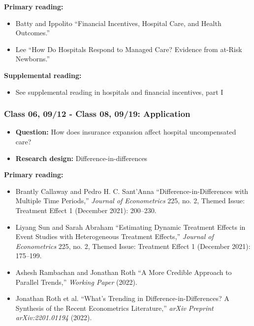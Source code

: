 \documentclass[11pt,]{article}
\providecommand{\tightlist}{%
  \setlength{\itemsep}{0pt}\setlength{\parskip}{0pt}}
\begin{document}
\textbf{Primary reading:}

\begin{itemize}
\tightlist
\item
  Batty and Ippolito {``Financial Incentives, Hospital Care, and Health
  Outcomes.''}
\item
  Lee {``How Do Hospitals Respond to Managed Care? {Evidence} from
  at-Risk Newborns.''}
\end{itemize}

\textbf{Supplemental reading:}

\begin{itemize}
\tightlist
\item
  See supplemental reading in hospitals and financial incentives, part I
\end{itemize}

\hypertarget{class-06-0912---class-08-0919-application}{%
\subsubsection{Class 06, 09/12 - Class 08, 09/19:
Application}\label{class-06-0912---class-08-0919-application}}

\begin{itemize}
\tightlist
\item
  \textbf{Question:} How does insurance expansion affect hospital
  uncompensated care?
\item
  \textbf{Research design:} Difference-in-differences
\end{itemize}

\textbf{Primary reading:}

\begin{itemize}
\tightlist
\item
  Brantly Callaway and Pedro H. C. Sant'Anna
  {``Difference-in-{Differences} with Multiple Time Periods,''}
  \emph{Journal of Econometrics} 225, no. 2, Themed {Issue}: {Treatment}
  {Effect} 1 (December 2021): 200--230.
\item
  Liyang Sun and Sarah Abraham {``Estimating Dynamic Treatment Effects
  in Event Studies with Heterogeneous Treatment Effects,''}
  \emph{Journal of Econometrics} 225, no. 2, Themed {Issue}: {Treatment}
  {Effect} 1 (December 2021): 175--199.
\item
  Ashesh Rambachan and Jonathan Roth {``A {More} {Credible} {Approach}
  to {Parallel} {Trends},''} \emph{Working Paper} (2022).
\item
  Jonathan Roth et al. {``What's {Trending} in
  {Difference}-in-{Differences}? {A} {Synthesis} of the {Recent}
  {Econometrics} {Literature},''} \emph{arXiv Preprint arXiv:2201.01194}
  (2022).
\end{itemize}
\end{document}
